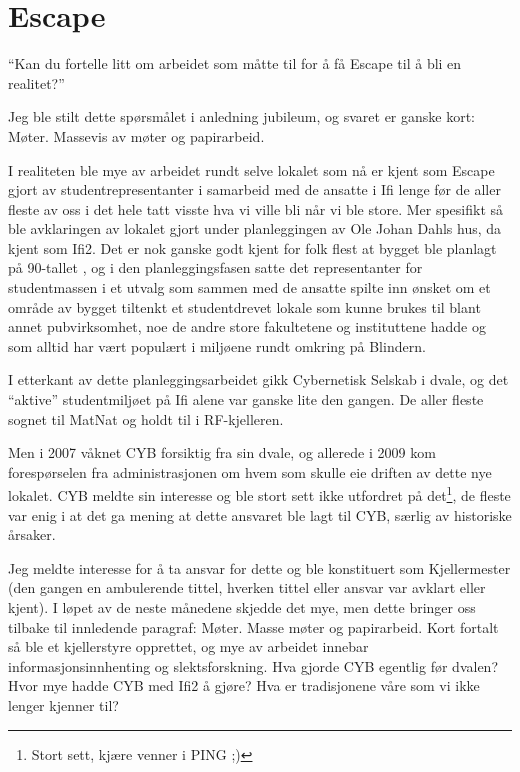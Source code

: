 \chapter{Escape}

\author{Skrevet av Magnus Johansen}

``Kan du fortelle litt om arbeidet som måtte til for å få Escape til å bli en realitet?''

Jeg ble stilt dette spørsmålet i anledning jubileum, og svaret er ganske kort: Møter. Massevis av møter og papirarbeid.

I realiteten ble mye av arbeidet rundt selve lokalet som nå er kjent som Escape gjort av studentrepresentanter i samarbeid med de ansatte i Ifi lenge før de aller fleste av oss i det hele tatt visste hva vi ville bli når vi ble store. Mer spesifikt så ble avklaringen av lokalet gjort under planleggingen av Ole Johan Dahls hus, da kjent som Ifi2. Det er nok ganske godt kjent for folk flest at bygget ble planlagt på 90-tallet , og i den planleggingsfasen satte det representanter for studentmassen i et utvalg som sammen med de ansatte spilte inn ønsket om et område av bygget tiltenkt et studentdrevet lokale som kunne brukes til blant annet pubvirksomhet, noe de andre store fakultetene og instituttene hadde og som alltid har vært populært i miljøene rundt omkring på Blindern.

I etterkant av dette planleggingsarbeidet gikk Cybernetisk Selskab i dvale, og det ``aktive'' studentmiljøet på Ifi alene var ganske lite den gangen. De aller fleste sognet til MatNat og holdt til i RF-kjelleren. 

Men i 2007 våknet CYB forsiktig fra sin dvale, og allerede i 2009 kom forespørselen fra administrasjonen om hvem som skulle eie driften av dette nye lokalet. CYB meldte sin interesse og ble stort sett ikke utfordret på det\footnote{Stort sett, kjære venner i PING ;)}, de fleste var enig i at det ga mening at dette ansvaret ble lagt til CYB, særlig av historiske årsaker.

Jeg meldte interesse for å ta ansvar for dette og ble konstituert som Kjellermester (den gangen en ambulerende tittel, hverken tittel eller ansvar var avklart eller kjent). I løpet av de neste månedene skjedde det mye, men dette bringer oss tilbake til innledende paragraf: Møter. Masse møter og papirarbeid. Kort fortalt så ble et kjellerstyre opprettet, og mye av arbeidet innebar informasjonsinnhenting og slektsforskning. Hva gjorde CYB egentlig før dvalen? Hvor mye hadde CYB med Ifi2 å gjøre? Hva er tradisjonene våre som vi ikke lenger kjenner til?

